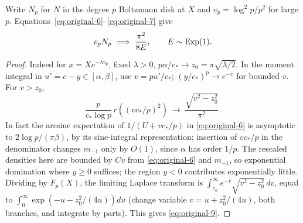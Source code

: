 \begin{lemma}\label{disk:volume-weak}

Write \(N_p\) for \(N\) in the degree \(p\) Boltzmann disk at \(X\) and \(v_p=\log^2 p/p^2\) for large \(p\).
Equations~\eqref{eq:original-6}--\eqref{eq:original-7} give
\begin{equation}
v_p N_p\ \Longrightarrow\ \frac{\pi^2}{8E},\qquad E\sim{\rm Exp}(1).
 \label{eq:original-9}
\end{equation}

\end{lemma}\begin{proof}

Indeed for \(x=X e^{-\lambda v_p}\), fixed \(\lambda>0\), \(p\alpha/c_*\to z_0=\pi\sqrt{\lambda/2}\).
In the moment integral in \(u'=c-y\in[\alpha,\beta]\), use \(v=p u'/c_*\); \((y/c_*)^p\to e^{-v}\) for bounded \(v\).
For \(v>z_0\),
\[
 \frac{p}{c_* \log p}\,r((v c_*/p)^2)\ \longrightarrow\
 \frac{\sqrt{v^2-z_0^2}}{\pi^2}.
\]
In fact the arcsine expectation of \(1/(U+v c_*/p)\) in \eqref{eq:original-6} is asymptotic to \(2\log p/(\pi\beta)\), by its sine-integral representation; insertion of \(v c_*/p\) in the denominator changes \(m_{-1}\) only by \(O(1)\), since \(\alpha\) has order \(1/p\).
The rescaled densities here are bounded by \(C v\) from \eqref{eq:original-6} and \(m_{-1}\), so exponential domination where \(y\ge0\) suffices; the region \(y<0\) contributes exponentially little.
Dividing by \(F_p(X)\), the limiting Laplace transform is \(\int_{z_0}^\infty e^{-v}\sqrt{v^2-z_0^2}\,dv\), equal to \(\int_0^\infty\exp(-u-z_0^2/(4u))du\) (change variable \(v=u+z_0^2/(4u)\), both branches, and integrate by parts).
This gives \eqref{eq:original-9}.

\end{proof}

